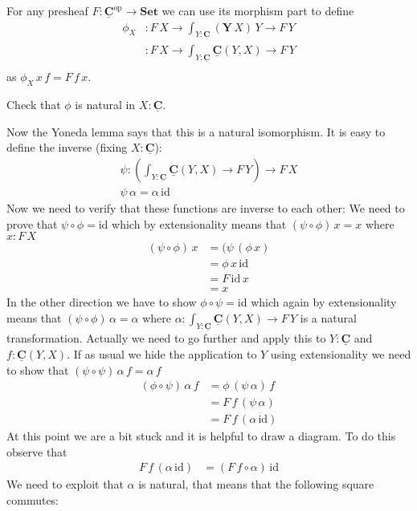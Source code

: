 \documentclass{article}
\newcommand{\Set}{\mathbf{Set}}
\newcommand{\cat}[1]{\underline{\mathbf{#1}}}
\newcommand{\id}{\mathrm{id}}
\newcommand{\op}{\mathrm{op}}
\newcommand{\Y}{\mathbf{Y}}
\begin{document}
For any presheaf $F : \cat{C}^\op\to\Set$ we can use its morphism part to define
\begin{align*}
  \phi_X & : F\,X \to \int_{Y : \cat{C}} (\Y\,X)\,Y \to F\,Y \\
            & :  F\,X \to \int_{Y : \cat{C}} \cat{C}(Y,X) \to F\,Y \\
\end{align*}
as $\phi_X\,x\,f = F\,f\,x$. 
\begin{Exercise}
  Check that $\phi$ is natural in $X:\cat{C}$.
\end{Exercise}

Now the Yoneda lemma says that this is a natural isomorphism. It is easy to define the inverse (fixing $X:\cat{C}$):
\begin{align*}
  \psi : (\int_{Y : \cat{C}} \cat{C}(Y,X) \to F\,Y) \to F\,X\\
  \psi\,\alpha = \alpha\,\id
\end{align*}
Now we need to verify that these functions are inverse to each other: We need to prove that $\psi \circ \phi = \id$ which by extensionality means that $(\psi \circ \phi)\,x = x$ where $x : F\,X$
\begin{align*}
  (\psi \circ \phi)\,x 
  & = (\psi\,(\phi\,x) \\
  & = \phi\,x\,\id \\
  & = F\,\id\,x \\
  & = x
\end{align*}
In the other direction we have to show $\phi \circ \psi = \id$ which again by extensionality means that 
$(\psi \circ \phi)\,\alpha = \alpha$ where $\alpha : \int_{Y : \cat{C}} \cat{C}(Y,X) \to F\,Y$ is a natural transformation. Actually we need to go further and apply this to $Y : \cat{C}$ and $f : \cat{C}(Y,X)$. If as usual we hide the application to $Y$ using extensionality we need to show that $(\psi \circ \psi)\,\alpha\,f = \alpha\,f$
\begin{align*}
  (\phi \circ \psi)\,\alpha\,f
  & = \phi\,(\psi\,\alpha)\,f \\
  & = F\,f\,(\psi\,\alpha) \\
  & = F\,f\,(\alpha\,\id) 
\end{align*}
At this point we are a bit stuck and it is helpful to draw a diagram. To do this observe that 
\begin{align*}
 F\,f\,(\alpha\,\id) 
 & = (F\, f \circ \alpha)\,\id
\end{align*}
We need to exploit that $\alpha$ is natural, that means that the following square commutes:
\end{document}

